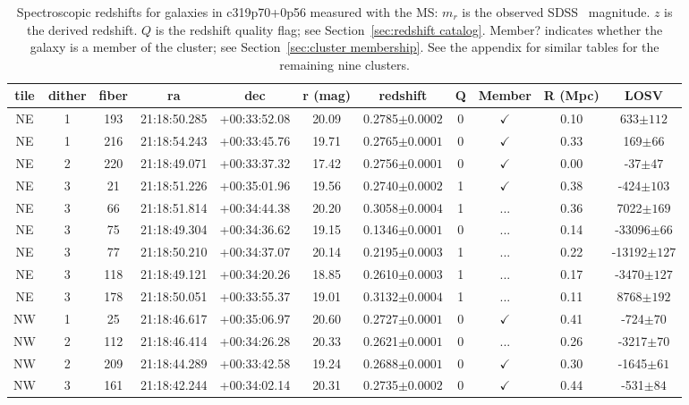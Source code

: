 \begin{table*}
	\centering \caption{Spectroscopic redshifts for galaxies in c319p70+0p56 measured with the MS: $m_r$ is the observed SDSS \sdssr\ magnitude. $z$ is the derived redshift. $Q$ is the redshift quality flag; see Section~\ref{sec:redshift catalog}. Member? indicates whether the galaxy is a member of the cluster; see Section~\ref{sec:cluster membership}. See the appendix for similar tables for the remaining nine clusters.}
	\begin{tabular}{ccccccccccc}
		\hline
		tile & dither & fiber & ra & dec & r (mag) & redshift & Q & Member & R (Mpc) & LOSV \\
		\hline \hline
NE & 1 & 193 & 21:18:50.285 & +00:33:52.08 & 20.09 & 0.2785$\pm{0.0002}$ & 0 & $\checkmark$ & 0.10 & 633$\pm{112}$ \\
NE & 1 & 216 & 21:18:54.243 & +00:33:45.76 & 19.71 & 0.2765$\pm{0.0001}$ & 0 & $\checkmark$ & 0.33 & 169$\pm{66}$ \\
NE & 2 & 220 & 21:18:49.071 & +00:33:37.32 & 17.42 & 0.2756$\pm{0.0001}$ & 0 & $\checkmark$ & 0.00 & -37$\pm{47}$ \\
NE & 3 & 21 & 21:18:51.226 & +00:35:01.96 & 19.56 & 0.2740$\pm{0.0002}$ & 1 & $\checkmark$ & 0.38 & -424$\pm{103}$ \\
NE & 3 & 66 & 21:18:51.814 & +00:34:44.38 & 20.20 & 0.3058$\pm{0.0004}$ & 1 & ... & 0.36 & 7022$\pm{169}$ \\
NE & 3 & 75 & 21:18:49.304 & +00:34:36.62 & 19.15 & 0.1346$\pm{0.0001}$ & 0 & ... & 0.14 & -33096$\pm{66}$ \\
NE & 3 & 77 & 21:18:50.210 & +00:34:37.07 & 20.14 & 0.2195$\pm{0.0003}$ & 1 & ... & 0.22 & -13192$\pm{127}$ \\
NE & 3 & 118 & 21:18:49.121 & +00:34:20.26 & 18.85 & 0.2610$\pm{0.0003}$ & 1 & ... & 0.17 & -3470$\pm{127}$ \\
NE & 3 & 178 & 21:18:50.051 & +00:33:55.37 & 19.01 & 0.3132$\pm{0.0004}$ & 1 & ... & 0.11 & 8768$\pm{192}$ \\
NW & 1 & 25 & 21:18:46.617 & +00:35:06.97 & 20.60 & 0.2727$\pm{0.0001}$ & 0 & $\checkmark$ & 0.41 & -724$\pm{70}$ \\
NW & 2 & 112 & 21:18:46.414 & +00:34:26.28 & 20.33 & 0.2621$\pm{0.0001}$ & 0 & ... & 0.26 & -3217$\pm{70}$ \\
NW & 2 & 209 & 21:18:44.289 & +00:33:42.58 & 19.24 & 0.2688$\pm{0.0001}$ & 0 & $\checkmark$ & 0.30 & -1645$\pm{61}$ \\
NW & 3 & 161 & 21:18:42.244 & +00:34:02.14 & 20.31 & 0.2735$\pm{0.0002}$ & 0 & $\checkmark$ & 0.44 & -531$\pm{84}$ \\

\end{tabular}
\end{table*}
